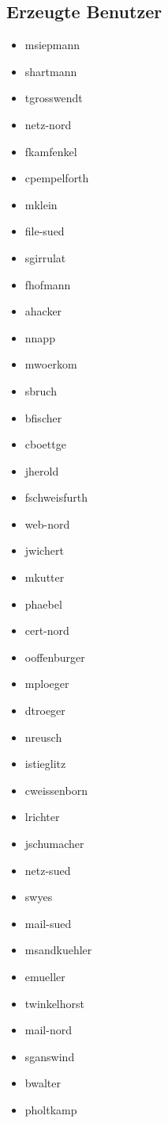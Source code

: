 \subsection{Erzeugte Benutzer}
\begin{itemize}
  \item msiepmann
  \item shartmann
  \item tgrosswendt
  \item netz-nord
  \item fkamfenkel
  \item cpempelforth
  \item mklein
  \item file-sued
  \item sgirrulat
  \item fhofmann
  \item ahacker
  \item nnapp
  \item mwoerkom
  \item sbruch
  \item bfischer
  \item cboettge
  \item jherold
  \item fschweisfurth
  \item web-nord
  \item jwichert
  \item mkutter
  \item phaebel
  \item cert-nord
  \item ooffenburger
  \item mploeger
  \item dtroeger
  \item nreusch
  \item istieglitz
  \item cweissenborn
  \item lrichter
  \item jschumacher
  \item netz-sued
  \item swyes
  \item mail-sued
  \item msandkuehler
  \item emueller
  \item twinkelhorst
  \item mail-nord
  \item sganswind
  \item bwalter
  \item pholtkamp

\end{itemize}
